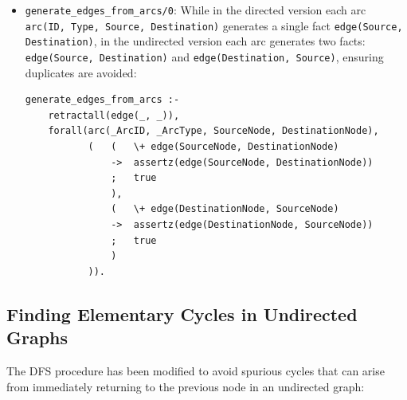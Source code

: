 \documentclass[12pt,a4paper]{article}
\begin{document}
\begin{itemize}
\item \texttt{generate\_edges\_from\_arcs/0}: While in the directed version each arc \texttt{arc(ID, Type, Source, Destination)} generates a single fact \texttt{edge(Source, Destination)}, in the undirected version each arc generates two facts: \texttt{edge(Source, Destination)} and \texttt{edge(Destination, Source)}, ensuring duplicates are avoided:

\begin{lstlisting}[style=prologstyle, basicstyle=\ttfamily\footnotesize]
generate_edges_from_arcs :-
    retractall(edge(_, _)),
    forall(arc(_ArcID, _ArcType, SourceNode, DestinationNode),
           (   (   \+ edge(SourceNode, DestinationNode)
               ->  assertz(edge(SourceNode, DestinationNode))
               ;   true
               ),
               (   \+ edge(DestinationNode, SourceNode)
               ->  assertz(edge(DestinationNode, SourceNode))
               ;   true
               )
           )).
\end{lstlisting}
\end{itemize}

\subsection{Finding Elementary Cycles in Undirected Graphs}
The DFS procedure has been modified to avoid spurious cycles that can arise from immediately returning to the previous node in an undirected graph:
\end{document}
